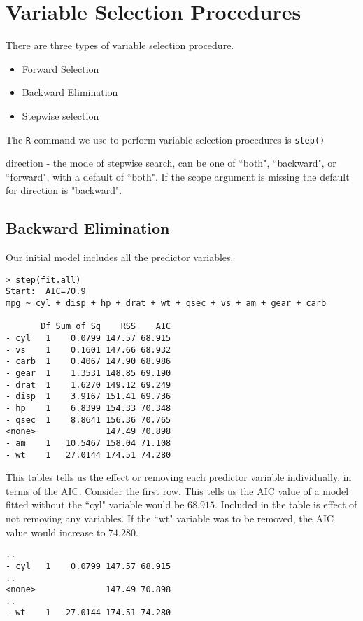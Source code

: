 
\newpage
\chapter{Variable Selection Procedures}


There are three types of variable selection procedure.
\begin{itemize}
\item Forward Selection
\item Backward Elimination
\item Stepwise selection
\end{itemize}

The \texttt{R} command we use to perform variable selection procedures is \texttt{step()}

direction  - the mode of stepwise search, can be one of ``both", ``backward", or ``forward", with a default of ``both". If the scope argument is missing the default for direction is "backward".

\section{Backward Elimination}
Our initial model includes all the predictor variables.
\footnotesize\begin{verbatim}
> step(fit.all)
Start:  AIC=70.9
mpg ~ cyl + disp + hp + drat + wt + qsec + vs + am + gear + carb

       Df Sum of Sq    RSS    AIC
- cyl   1    0.0799 147.57 68.915
- vs    1    0.1601 147.66 68.932
- carb  1    0.4067 147.90 68.986
- gear  1    1.3531 148.85 69.190
- drat  1    1.6270 149.12 69.249
- disp  1    3.9167 151.41 69.736
- hp    1    6.8399 154.33 70.348
- qsec  1    8.8641 156.36 70.765
<none>              147.49 70.898
- am    1   10.5467 158.04 71.108
- wt    1   27.0144 174.51 74.280
\end{verbatim}\normalsize

This tables tells us the effect or removing each predictor variable individually, in terms of the AIC.
Consider the first row. This tells us the AIC value of a model fitted without the ``cyl" variable would be $68.915$.
Included in the table is effect of not removing any variables. If the ``wt" variable was to be removed, the AIC value would increase to $74.280$.
\footnotesize
\begin{verbatim}
..
- cyl   1    0.0799 147.57 68.915
..
<none>              147.49 70.898
..
- wt    1   27.0144 174.51 74.280
\end{verbatim}
\normalsize

